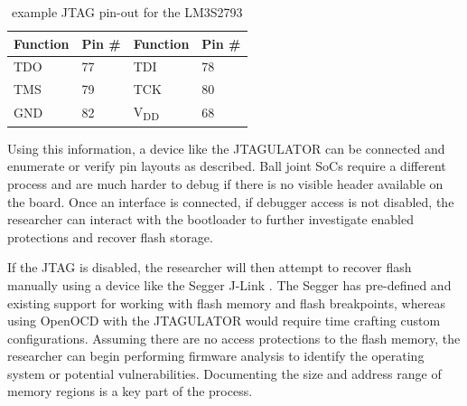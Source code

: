 \begin{table}[H]
  \centering
  \begin{tabular}{|p{3cm}|p{3cm}|p{3cm}|p{3cm}|}

    

    \hline\rowcolor{gray!30}
    \textbf{Function} & \textbf{Pin \#} & \textbf{Function} & \textbf{Pin \#}  \\
    \hline

    TDO & 77 & TDI & 78 \\
    \hline

    TMS & 79 & TCK & 80 \\
    \hline

    GND & 82 & V\textsubscript{DD} & 68 \\
    \hline

  \end{tabular}
  \caption{example JTAG pin-out for the LM3S2793}
  \label{table:example_jtag_pinout}%
\end{table}

Using this information, a device like the JTAGULATOR \autocite{JTAGulator2023} can be connected and enumerate or verify pin layouts as described. Ball joint SoCs require a different process and are much harder to debug if there is no visible header available on the board. Once an interface is connected, if debugger access is not disabled, the researcher can interact with the bootloader to further investigate enabled protections and recover flash storage.

If the JTAG is disabled, the researcher will then attempt to recover flash manually using a device like the Segger J-Link \autocite{SEGGERJLinkDebug}. The Segger has pre-defined and existing support for working with flash memory and flash breakpoints, whereas using OpenOCD with the JTAGULATOR would require time crafting custom configurations. Assuming there are no access protections to the flash memory, the researcher can begin performing firmware analysis to identify the operating system or potential vulnerabilities. Documenting the size and address range of memory regions is a key part of the process.